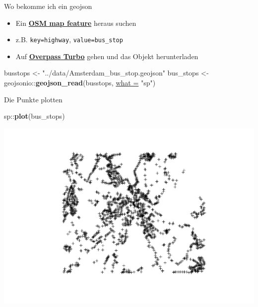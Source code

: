 \documentclass[ignorenonframetext,]{beamer}
\newenvironment{Shaded}{\begin{snugshade}}{\end{snugshade}}
\newcommand{\DataTypeTok}[1]{\textcolor[rgb]{0.74,0.68,0.62}{\underline{#1}}}
\newcommand{\KeywordTok}[1]{\textcolor[rgb]{0.26,0.66,0.93}{\textbf{#1}}}
\newcommand{\NormalTok}[1]{\textcolor[rgb]{0.74,0.68,0.62}{#1}}
\newcommand{\OperatorTok}[1]{\textcolor[rgb]{0.74,0.68,0.62}{#1}}
\newcommand{\StringTok}[1]{\textcolor[rgb]{0.02,0.61,0.04}{#1}}
\providecommand{\tightlist}{%
  \setlength{\itemsep}{0pt}\setlength{\parskip}{0pt}}
\begin{document}
\begin{frame}[fragile]{Wo bekomme ich ein geojson}
\protect\hypertarget{wo-bekomme-ich-ein-geojson}{}

\begin{itemize}
\tightlist
\item
  Ein
  \href{https://wiki.openstreetmap.org/wiki/Map_Features}{\textbf{OSM
  map feature}} heraus suchen
\item
  z.B. \texttt{key=highway}, \texttt{value=bus\_stop}
\item
  Auf \href{https://overpass-turbo.eu/}{\textbf{Overpass Turbo}} gehen
  und das Objekt herunterladen
\end{itemize}

\begin{Shaded}
\begin{Highlighting}[]
\NormalTok{busstops <-}\StringTok{ "../data/Amsterdam_bus_stop.geojson"}
\NormalTok{bus_stops <-}\StringTok{ }\NormalTok{geojsonio}\OperatorTok{::}\KeywordTok{geojson_read}\NormalTok{(busstops,}
  \DataTypeTok{what =} \StringTok{"sp"}\NormalTok{)}
\end{Highlighting}
\end{Shaded}

\end{frame}

\begin{frame}[fragile]{Die Punkte plotten}
\protect\hypertarget{die-punkte-plotten}{}

\begin{Shaded}
\begin{Highlighting}[]
\NormalTok{sp}\OperatorTok{::}\KeywordTok{plot}\NormalTok{(bus_stops)}
\end{Highlighting}
\end{Shaded}

\includegraphics{B6_using_javascript_files/figure-beamer/unnamed-chunk-32-1.pdf}

\end{frame}
\end{document}
